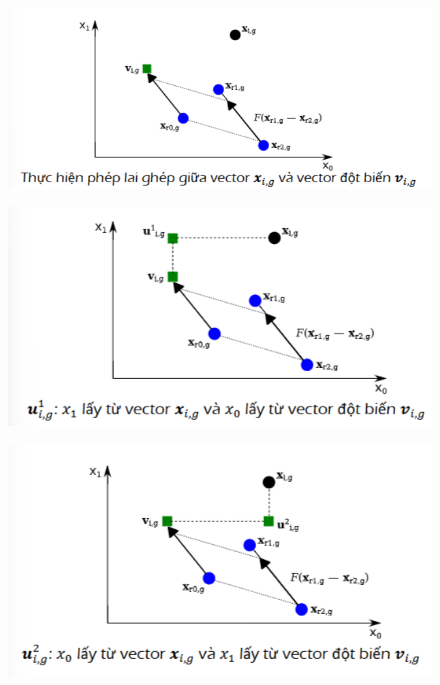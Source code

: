 \documentclass{book}
\begin{document}
\begin{figure}[H]
    \centering
    \includegraphics[width=1\linewidth]{images/GA-3_6.png}
\end{figure}

\begin{figure}[H]
    \centering
    \includegraphics[width=1\linewidth]{images/GA-3_7.png}
\end{figure}

\begin{figure}[H]
    \centering
    \includegraphics[width=1\linewidth]{images/GA-3_8.png}
\end{figure}
\end{document}
